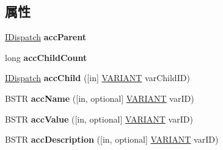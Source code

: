 \subsection*{属性}
\begin{DoxyCompactItemize}
\item 
\mbox{\label{interface_i_accessible_a58f81dc1ceebd56d52f412f97559b28d}} 
\hyperlink{interface_i_dispatch}{I\+Dispatch} {\bfseries acc\+Parent}
\item 
\mbox{\label{interface_i_accessible_ad59e743805511be0de456597d6b90b48}} 
long {\bfseries acc\+Child\+Count}
\item 
\mbox{\label{interface_i_accessible_a9799138e506df89d7f8fdd835a46fb6d}} 
\hyperlink{interface_i_dispatch}{I\+Dispatch} {\bfseries acc\+Child} (\mbox{[}in\mbox{]} \hyperlink{structtag_v_a_r_i_a_n_t}{V\+A\+R\+I\+A\+NT} var\+Child\+ID)
\item 
\mbox{\label{interface_i_accessible_ad9fa878cc5d8a0de98513d87e51202a3}} 
B\+S\+TR {\bfseries acc\+Name} (\mbox{[}in, optional\mbox{]} \hyperlink{structtag_v_a_r_i_a_n_t}{V\+A\+R\+I\+A\+NT} var\+ID)
\item 
\mbox{\label{interface_i_accessible_a92a37333062683a32718ae4b3b17d525}} 
B\+S\+TR {\bfseries acc\+Value} (\mbox{[}in, optional\mbox{]} \hyperlink{structtag_v_a_r_i_a_n_t}{V\+A\+R\+I\+A\+NT} var\+ID)
\item 
\mbox{\label{interface_i_accessible_ab1fd2c51eeec60501154feedfee7ce1d}} 
B\+S\+TR {\bfseries acc\+Description} (\mbox{[}in, optional\mbox{]} \hyperlink{structtag_v_a_r_i_a_n_t}{V\+A\+R\+I\+A\+NT} var\+ID)
\item 

\end{DoxyCompactItemize}
